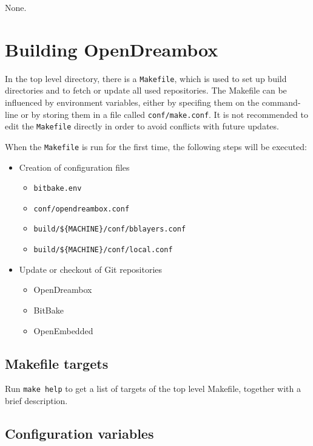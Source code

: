 \documentclass[a4paper]{article}
\newcommand{\shell}[1]{\texttt{\small #1}}
\begin{document}
  None.

\pagebreak

\section{Building OpenDreambox}

  In the top level directory, there is a \shell{Makefile}, which is used to
  set up build directories and to fetch or update all used repositories.
  The Makefile can be influenced by environment variables, either
  by specifing them on the command-line or by storing them in a file called
  \shell{conf/make.conf}. It is not recommended to edit the \shell{Makefile} directly
  in order to avoid conflicts with future updates.

  When the \shell{Makefile} is run for the first time, the following steps will
  be executed:

  \begin{itemize}
    \item Creation of configuration files
      \begin{itemize}
        \item \shell{bitbake.env}
        \item \shell{conf/opendreambox.conf}
        \item \shell{build/\$\{MACHINE\}/conf/bblayers.conf}
        \item \shell{build/\$\{MACHINE\}/conf/local.conf}
      \end{itemize}
    \item Update or checkout of Git repositories
      \begin{itemize}
        \item OpenDreambox
        \item BitBake
        \item OpenEmbedded
      \end{itemize}
  \end{itemize}

  \subsection{Makefile targets}
    Run \shell{make help} to get a list of targets of the top level Makefile, together with a brief description.

  \subsection{Configuration variables}
\end{document}
